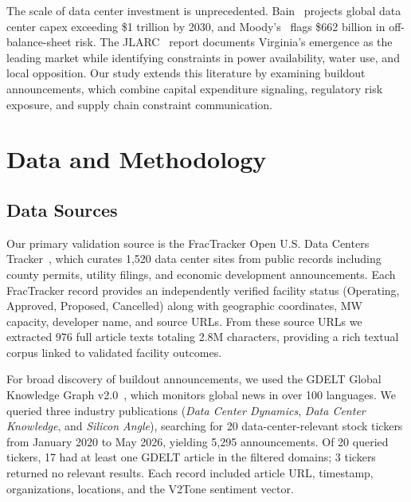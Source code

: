 \documentclass[5p,12pt]{elsarticle}
\begin{document}
The scale of data center investment is unprecedented. Bain~\cite{Bain2025GlobalForecast} projects global data center capex exceeding \$1 trillion by 2030, and Moody's~\cite{Moodys2025Outlook,Lichtenberg2026OffBalance} flags \$662 billion in off-balance-sheet risk. The JLARC~\cite{JLARC2024Virginia} report documents Virginia's emergence as the leading market while identifying constraints in power availability, water use, and local opposition. Our study extends this literature by examining buildout announcements, which combine capital expenditure signaling, regulatory risk exposure, and supply chain constraint communication.

\section{Data and Methodology}
\label{sec:data}

\subsection{Data Sources}

Our primary validation source is the FracTracker Open U.S. Data Centers Tracker~\cite{FracTracker2025Open}, which curates 1,520 data center sites from public records including county permits, utility filings, and economic development announcements. Each FracTracker record provides an independently verified facility status (Operating, Approved, Proposed, Cancelled) along with geographic coordinates, MW capacity, developer name, and source URLs. From these source URLs we extracted 976 full article texts totaling 2.8M characters, providing a rich textual corpus linked to validated facility outcomes.

For broad discovery of buildout announcements, we used the GDELT Global Knowledge Graph v2.0~\cite{GDELT2022GKG}, which monitors global news in over 100 languages. We queried three industry publications (\emph{Data Center Dynamics}, \emph{Data Center Knowledge}, and \emph{Silicon Angle}), searching for 20 data-center-relevant stock tickers from January 2020 to May 2026, yielding 5,295 announcements. Of 20 queried tickers, 17 had at least one GDELT article in the filtered domains; 3 tickers returned no relevant results. Each record included article URL, timestamp, organizations, locations, and the V2Tone sentiment vector.
\end{document}
